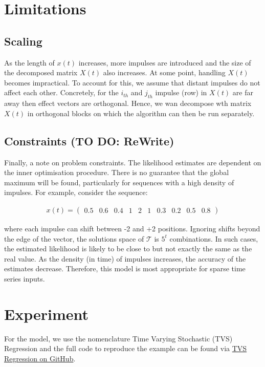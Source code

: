 \documentclass[11pt]{amsart}
\theoremstyle{definition}
\begin{document}
\section{Limitations}
\subsection{Scaling}
As the length of $x(t)$ increases, more impulses are introduced and the size of the decomposed matrix $X(t)$ also increases. At some point, handling $X(t)$ becomes impractical. To account for this, we assume that distant impulses do not affect each other. Concretely, for the $i_{th}$ and $j_{th}$ impulse (row) in $X(t)$ are far away then effect vectors are orthogonal. Hence, we wan decompose wth matrix $X(t)$ in orthogonal blocks on which the algorithm can then be run separately.

\subsection{Constraints (TO DO: ReWrite)}
Finally, a note on problem constraints. The likelihood estimates are dependent on the inner optimisation procedure. There is no guarantee that the global maximum will be found, particularly for sequences with a high density of impulses. For example, consider the sequence:

\begin{align*}
    x(t) = 
    \left(
\begin{array}{cccccccccc}
    0.5 & 0.6 & 0.4 & 1 & 2 & 1 &
    0.3 & 0.2 & 0.5 & 0.8 
\end{array}  
\right)
\end{align*}

where each impulse can shift between -2 and +2 positions. Ignoring shifts beyond the edge of the vector, the solutions space of $\mathcal{T}$ is $5^t$ combinations.  
In such cases, the estimated likelihood is likely to be close to but not exactly the same as the real value. As the density (in time) of impulses increases, the accuracy of the estimates decrease. Therefore, this model is most appropriate for sparse time series inputs.

\section{Experiment}

For the model, we use the nomenclature Time Varying Stochastic (TVS) Regression and the full code to reproduce the example can be found via \href{https://github.com/aaron1rcl/tvs_regression/}{TVS Regression on GitHub}.
\end{document}
